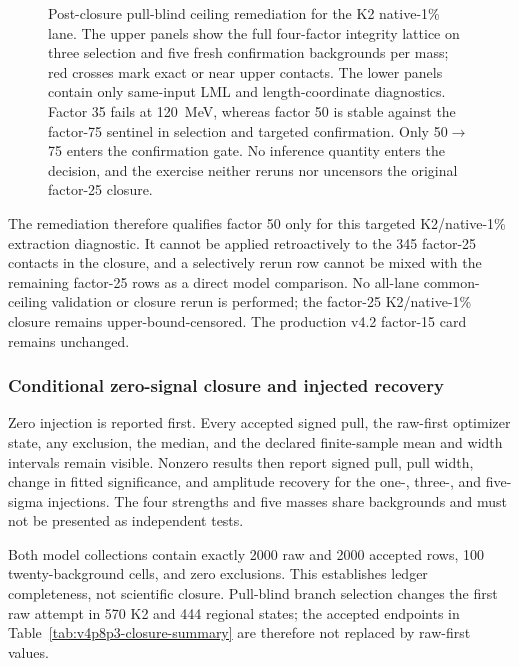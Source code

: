 \begin{figure}[htbp]
\centering
{}
\caption{Post-closure pull-blind ceiling remediation for the K2 native-1\%
lane.  The upper panels show the full four-factor integrity lattice on three
selection and five fresh confirmation backgrounds per mass; red crosses mark
exact or near upper contacts.  The lower panels contain only same-input LML
and length-coordinate diagnostics.  Factor 35 fails at 120~MeV, whereas
factor 50 is stable against the factor-75 sentinel in selection and targeted
confirmation.  Only 50$\to$75 enters the confirmation gate.  No inference
quantity enters the decision, and the exercise neither reruns nor uncensors
the original factor-25 closure.}
\label{fig:v4p8p3-ceiling-remediation}
\end{figure}

The remediation therefore qualifies factor 50 only for this targeted
K2/native-1\% extraction diagnostic.  It cannot be applied retroactively to
the 345 factor-25 contacts in the closure, and a selectively rerun row cannot
be mixed with the remaining factor-25 rows as a direct model comparison.  No
all-lane common-ceiling validation or closure rerun is performed; the
factor-25 K2/native-1\% closure remains upper-bound-censored.  The production
v4.2 factor-15 card remains unchanged.

\subsubsection{Conditional zero-signal closure and injected recovery}

Zero injection is reported first.  Every accepted signed pull, the raw-first
optimizer state, any exclusion, the median, and the declared finite-sample mean
and width intervals remain visible.  Nonzero results then report signed pull,
pull width, change in fitted significance, and amplitude recovery for the one-,
three-, and five-sigma injections.  The four strengths and five masses share
backgrounds and must not be presented as independent tests.

Both model collections contain exactly 2000 raw and 2000 accepted rows, 100
twenty-background cells, and zero exclusions.  This establishes ledger
completeness, not scientific closure.  Pull-blind branch selection changes the
first raw attempt in 570 K2 and 444 regional states; the accepted endpoints in
Table~\ref{tab:v4p8p3-closure-summary} are therefore not replaced by raw-first
values.

